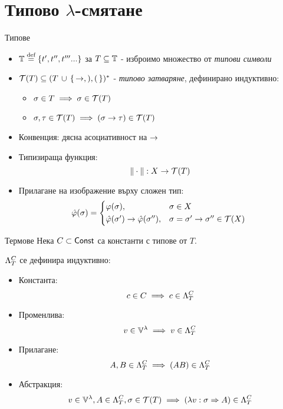 \documentclass[9pt]{beamer}
\begin{document}
  \section{Типово $\lambda$-смятане}
  \begin{frame}{Типове}
    \begin{itemize}
      \item $\tsymbs \defeq \{ t', t'', t''' ... \}$ за $T \subseteq \tsymbs$ - изброимо множество от \emph{типови символи}
      \item $\tclos{T} \subseteq (T \, \cup \,\{\, \tot, ), ( \,\})^*$ - \emph{типово затваряне},
        дефинирано индуктивно:
          \begin{itemize}
              \item $\sigma \in T \implies \sigma \in \tclos{T}$
              \item $\sigma, \tau \in \tclos{T} \implies (\sigma \tot \tau) \in \tclos{T}$
          \end{itemize}
      \item Конвенция: дясна асоциативност на $\tot$
      \item Типизираща функция:
        \[ \typeoff : X \fun \tclos{T} \]
      \item Прилагане на изображение върху сложен тип:
        \begin{equation*}
            \hat{\varphi}(\sigma) =
            \begin{cases*}
                \varphi(\sigma) ,& $\sigma \in X$ \\
                \hat{\varphi}(\sigma') \tot \hat{\varphi}(\sigma'') ,&
                    $\sigma = \sigma' \tot \sigma'' \in \tclos{X}$ \\
            \end{cases*}
        \end{equation*}
    \end{itemize}
  \end{frame}
  \begin{frame}{Термове}
    Нека $C \subset \const$ са константи с типове от $T$.

    $\plambda{T}{C}$ се дефинира индуктивно:
    \begin{itemize}
        \item Константа:  \[ c \in C \implies c \in \plambda{T}{C} \]
        \item Променлива: \[ v \in \lvars \implies v \in \plambda{T}{C} \]
        \item Прилагане:  \[ A, B \in \plambda{T}{C} \implies (AB) \in \plambda{T}{C} \]
        \item Абстракция: \[ v \in \lvars, A \in \plambda{T}{C}, \sigma \in \tclos{T}
                \implies (\lambda v : \sigma \abstr A) \in \plambda{T}{C} \]
    \end{itemize}
  \end{frame}
\end{document}
